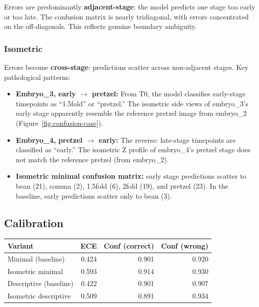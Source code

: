 \documentclass[11pt, a4paper]{article}
\begin{document}
Errors are predominantly \textbf{adjacent-stage}: the model predicts one stage
too early or too late.  The confusion matrix is nearly tridiagonal, with errors
concentrated on the off-diagonals.  This reflects genuine boundary ambiguity.

\subsubsection{Isometric}

Errors become \textbf{cross-stage}: predictions scatter across non-adjacent
stages.  Key pathological patterns:

\begin{itemize}[leftmargin=*, itemsep=2pt]
  \item \textbf{Embryo\_3, early $\to$ pretzel:} From T0, the model classifies
    early-stage timepoints as ``1.5fold'' or ``pretzel.''  The isometric side
    views of embryo\_3's early stage apparently resemble the reference pretzel
    image from embryo\_2 (Figure~\ref{fig:confusion-case}).

  \item \textbf{Embryo\_4, pretzel $\to$ early:} The reverse: late-stage
    timepoints are classified as ``early.''  The isometric Z profile of
    embryo\_4's pretzel stage does not match the reference pretzel (from
    embryo\_2).

  \item \textbf{Isometric minimal confusion matrix:} early stage predictions
    scatter to bean (21), comma (2), 1.5fold (6), 2fold (19), and pretzel (23).
    In the baseline, early predictions scatter only to bean (3).
\end{itemize}

\subsection{Calibration}

\begin{center}
\begin{tabular}{@{}lrrr@{}}
\toprule
\textbf{Variant} & \textbf{ECE} & \textbf{Conf (correct)} & \textbf{Conf (wrong)} \\
\midrule
Minimal (baseline)      & 0.424 & 0.901 & 0.920 \\
Isometric minimal       & 0.593 & 0.914 & 0.930 \\
\addlinespace
Descriptive (baseline)  & 0.422 & 0.901 & 0.907 \\
Isometric descriptive   & 0.509 & 0.891 & 0.934 \\
\bottomrule
\end{tabular}
\end{center}
\end{document}
